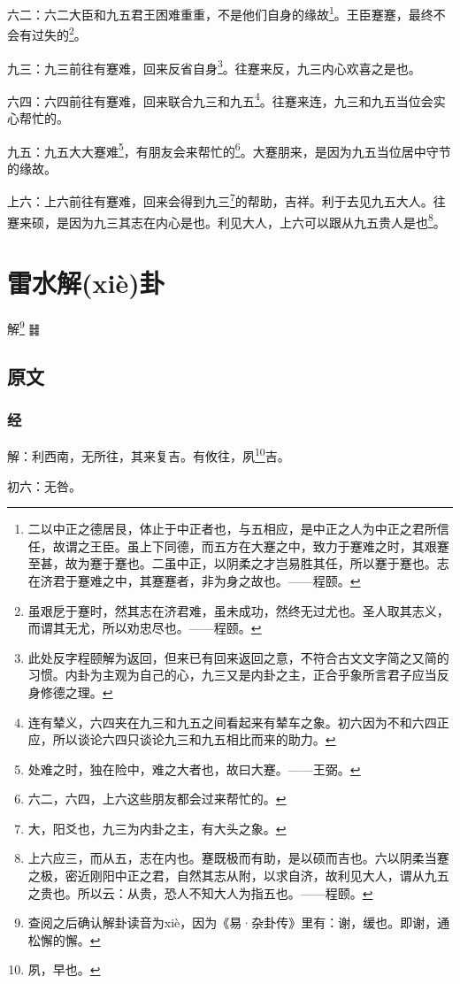 \documentclass[12pt,oneside]{book}
\begin{document}
六二：六二大臣和九五君王困难重重，不是他们自身的缘故\footnote{二以中正之德居艮，体止于中正者也，与五相应，是中正之人为中正之君所信任，故谓之王臣。虽上下同德，而五方在大蹇之中，致力于蹇难之时，其艰蹇至甚，故为蹇于蹇也。二虽中正，以阴柔之才岂易胜其任，所以蹇于蹇也。志在济君于蹇难之中，其蹇蹇者，非为身之故也。——程颐。}。王臣蹇蹇，最终不会有过失的\footnote{虽艰戹于蹇时，然其志在济君难，虽未成功，然终无过尤也。圣人取其志义，而谓其无尤，所以劝忠尽也。——程颐。}。

九三：九三前往有蹇难，回来反省自身\footnote{此处反字程颐解为返回，但来已有回来返回之意，不符合古文文字简之又简的习惯。内卦为主观为自己的心，九三又是内卦之主，正合乎象所言君子应当反身修德之理。}。往蹇来反，九三内心欢喜之是也。

六四：六四前往有蹇难，回来联合九三和九五\footnote{连有辇义，六四夹在九三和九五之间看起来有辇车之象。初六因为不和六四正应，所以谈论六四只谈论九三和九五相比而来的助力。}。往蹇来连，九三和九五当位会实心帮忙的。

九五：九五大大蹇难\footnote{处难之时，独在险中，难之大者也，故曰大蹇。——王弼。}，有朋友会来帮忙的\footnote{六二，六四，上六这些朋友都会过来帮忙的。}。大蹇朋来，是因为九五当位居中守节的缘故。

上六：上六前往有蹇难，回来会得到九三\footnote{大，阳爻也，九三为内卦之主，有大头之象。}的帮助，吉祥。利于去见九五大人。往蹇来硕，是因为九三其志在内心是也。利见大人，上六可以跟从九五贵人是也\footnote{上六应三，而从五，志在内也。蹇既极而有助，是以硕而吉也。六以阴柔当蹇之极，密近刚阳中正之君，自然其志从附，以求自济，故利见大人，谓从九五之贵也。所以云：从贵，恐人不知大人为指五也。——程颐。}。



\chapter{雷水解(xiè)卦}
解\footnote{查阅之后确认解卦读音为xiè，因为《易·杂卦传》里有：谢，缓也。即谢，通松懈的懈。} {\Large ䷧}

\section{原文}

\subsection{经}
解：利西南，无所往，其来复吉。有攸往，夙\footnote{夙，早也。}吉。

初六：无咎。
\end{document}
